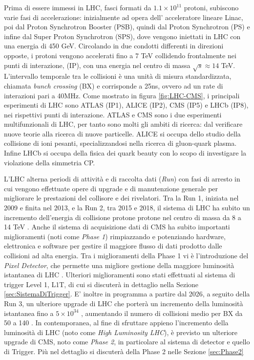 Prima di essere immessi in LHC, fasci formati da $1.1 \times 10^{11}$ protoni, subiscono varie fasi di accelerazione: inizialmente ad opera dell' acceleratore lineare Linac, poi dal Proton Synchrotron Booster (PSB), quindi dal Proton Synchrotron (PS) e infine dal Super Proton Synchrotron (SPS), dove vengono iniettati in LHC con una energia di 450 GeV. Circolando in due condotti differenti in direzioni opposte, i protoni vengono accelerati fino a 7 TeV collidendo frontalmente nei punti di interazione, (IP), con una energia nel centro di massa $\sqrt{s} \approx 14$ TeV. L'intervallo temporale tra le collisioni è una unità di misura standardizzata, chiamata \textit{bunch crossing} (BX) e corrisponde a 25ns, ovvero ad un rate di interazioni pari a 40MHz.\newline
Come mostrato in figura \ref{fig:LHC-CMS}, i principali esperimenti di LHC sono ATLAS (IP1), ALICE (IP2), CMS (IP5) e LHCb (IP8), nei rispettivi punti di interazione. \newline
ATLAS e CMS sono i due esperimenti multifunzionali di LHC, per tanto sono molti gli ambiti di ricerca: dal verificare nuove teorie alla ricerca di nuove particelle. ALICE si occupa dello studio della collisione di ioni pesanti, specializzandosi nella ricerca di gluon-quark plasma. Infine LHCb
si occupa della fisica dei quark beauty con lo scopo di investigare la violazione della simmetria CP.

L'LHC alterna periodi di attività e di raccolta dati (\textit{Run}) con fasi di arresto in cui vengono effettuate opere di upgrade e di manutenzione generale per migliorare le prestazioni del collisore e dei rivelatori. Tra la Run 1, iniziata nel 2009 e finita nel 2013, e la Run 2, tra 2015 e 2018, il sistema di LHC ha subito un incremento dell'energia di collisione protone protone nel centro di massa da 8 a 14 TeV \cite{sirunyan2020performance}. Anche il sistema di acquisizione dati di CMS ha subito importanti miglioramenti (noti come \textit{Phase 1}) rimpiazzando e potenziando hardware, elettronica e software per gestire il maggiore flusso di dati prodotto dalle collisioni ad alta energia. Tra i miglioramenti della Phase 1 vi è l'introduzione del \textit{Pixel Detector}, che permette una migliore gestione della maggiore luminosità istantanea di LHC \cite{Adam:2748381}. Ulteriori miglioramenti sono stati effettuati al sistema di trigger Level 1, L1T, di cui si discuterà in dettaglio nella Sezione \ref{sec:SistemaDiTrigger}. \newline
E' inoltre in programma a partire dal 2026, a seguito della Run 3, un ulteriore upgrade di LHC che porterà un incremento della luminosità istantanea fino a $5\times 10^{34}$ \Lumi, aumentando il numero di collisioni medio per BX da 50 a 140 \cite{collaboration2021phase}. In contemporanea, al fine di sfruttare appieno l'incremento della luminosità di LHC (noto come \textit{High Luminosity LHC}), è previsto un ulteriore upgrade di CMS, noto come \textit{Phase 2}, in particolare al sistema di detector e quello di Trigger. Più nel dettaglio si discuterà della Phase 2 nelle Sezione \ref{sec:Phase2}

